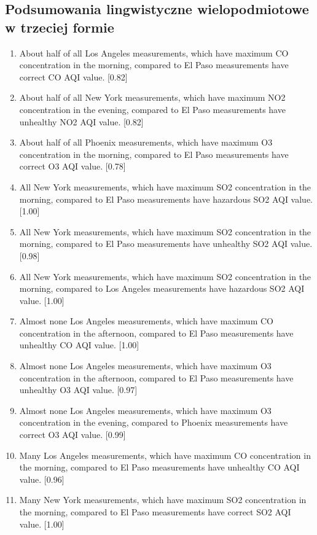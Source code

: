 \documentclass{classrep}
\begin{document}
{        \subsection{Podsumowania lingwistyczne wielopodmiotowe w trzeciej formie} {
            \begin{enumerate}
                \item About half of all Los Angeles measurements, which have maximum CO concentration in the morning, compared to El Paso measurements have correct CO AQI value. [0.82]
                \item About half of all New York measurements, which have maximum NO2 concentration in the evening, compared to El Paso measurements have unhealthy NO2 AQI value. [0.82]
                \item About half of all Phoenix measurements, which have maximum O3 concentration in the morning, compared to El Paso measurements have correct O3 AQI value. [0.78]
                \item All New York measurements, which have maximum SO2 concentration in the morning, compared to El Paso measurements have hazardous SO2 AQI value. [1.00]
                \item All New York measurements, which have maximum SO2 concentration in the morning, compared to El Paso measurements have unhealthy SO2 AQI value. [0.98]
                \item All New York measurements, which have maximum SO2 concentration in the morning, compared to Los Angeles measurements have hazardous SO2 AQI value. [1.00]
                \item Almost none Los Angeles measurements, which have maximum CO concentration in the afternoon, compared to El Paso measurements have unhealthy CO AQI value. [1.00]
                \item Almost none Los Angeles measurements, which have maximum O3 concentration in the afternoon, compared to El Paso measurements have unhealthy O3 AQI value. [0.97]
                \item Almost none Los Angeles measurements, which have maximum O3 concentration in the evening, compared to Phoenix measurements have correct O3 AQI value. [0.99]
                \item Many Los Angeles measurements, which have maximum CO concentration in the morning, compared to El Paso measurements have unhealthy CO AQI value. [0.96]
                \item Many New York measurements, which have maximum SO2 concentration in the morning, compared to El Paso measurements have correct SO2 AQI value. [1.00]

\end{enumerate}}}
\end{document}
